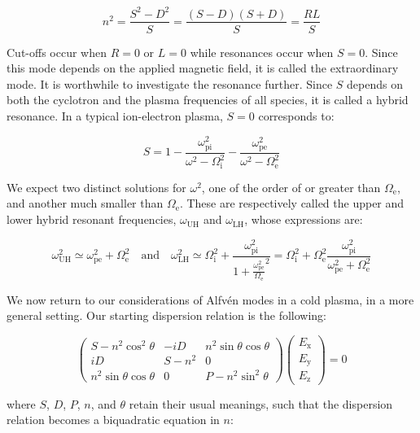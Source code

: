\begin{equation}
    n^2=\frac{S^2-D^2}{S}=\frac{(S-D)(S+D)}{S}=\frac{RL}{S}
\end{equation}

Cut-offs occur when $R=0$ or $L=0$ while resonances occur when $S=0$. Since this mode depends on the applied magnetic field, it is called the extraordinary mode. It is worthwhile to investigate the resonance further. Since $S$ depends on both the cyclotron and the plasma frequencies of all species, it is called a hybrid resonance. In a typical ion-electron plasma, $S=0$ corresponds to:

\begin{equation}
    S=1-\frac{\omega_\text{pi}^2}{\omega^2-\Omega_\mathrm{i}^2}-\frac{\omega_\text{pe}^2}{\omega^2-\Omega_\text{e}^2}
\end{equation}

We expect two distinct solutions for $\omega^2$, one of the order of or greater than $\Omega_\text{e}$, and another much smaller than $\Omega_\text{e}$. These are respectively called the upper and lower hybrid resonant frequencies, $\omega_\text{UH}$ and $\omega_\text{LH}$, whose expressions are:

\begin{equation}
    \omega_\text{UH}^2\simeq\omega_\text{pe}^2+\Omega_\text{e}^2\quad\text{and}\quad\omega_\text{LH}^2\simeq\Omega_\mathrm{i}^2+\frac{\omega_\text{pi}^2}{1+\frac{\omega_\text{pe}^2}{\Omega_\text{e}}^2}=\Omega_\mathrm{i}^2+\Omega_\text{e}^2\frac{\omega_\text{pi}^2}{\omega_\text{pe}^2+\Omega_\text{e}^2}
\end{equation}

We now return to our considerations of Alfvén modes in a cold plasma, in a more general setting. Our starting dispersion relation is the following:

\begin{equation}
    \begin{pmatrix}S-n^2\cos^2{\theta}&-iD&n^2\sin{\theta}\cos{\theta}\\iD&S-n^2&0\\n^2\sin{\theta}\cos{\theta}&0&P-n^2\sin^2{\theta}\end{pmatrix}\begin{pmatrix}E_\mathrm{x}\\E_\mathrm{y}\\E_\text{z}\end{pmatrix}=0
\end{equation}

where $S$, $D$, $P$, $n$, and $\theta$ retain their usual meanings, such that the dispersion relation becomes a biquadratic equation in $n$:

